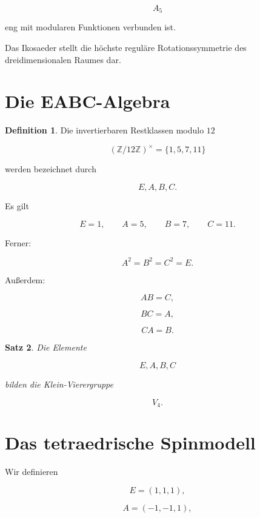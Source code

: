 \documentclass[11pt,a4paper]{article}
\newtheorem{satz}{Satz}[section]
\theoremstyle{definition}
\newtheorem{definition}[satz]{Definition}
\theoremstyle{remark}
\begin{document}
	\[
	A_5
	\]
	
	eng mit modularen Funktionen verbunden ist.
	
	Das Ikosaeder stellt die höchste reguläre
	Rotationssymmetrie des dreidimensionalen Raumes dar.
	
	
	\section{Die EABC-Algebra}
	
	\begin{definition}
		
		Die invertierbaren Restklassen modulo \(12\)
		
		\[
		(\mathbb Z/12\mathbb Z)^\times
		=
		\{1,5,7,11\}
		\]
		
		werden bezeichnet durch
		
		\[
		E,A,B,C.
		\]
		
	\end{definition}
	
	Es gilt
	
	\[
	E=1,
	\qquad
	A=5,
	\qquad
	B=7,
	\qquad
	C=11.
	\]
	
	Ferner:
	
	\[
	A^2=B^2=C^2=E.
	\]
	
	Außerdem:
	
	\[
	AB=C,
	\]
	
	\[
	BC=A,
	\]
	
	\[
	CA=B.
	\]
	
	\begin{satz}
		
		Die Elemente
		
		\[
		E,A,B,C
		\]
		
		bilden die Klein-Vierergruppe
		
		\[
		V_4.
		\]
		
	\end{satz}
	
	
	\section{Das tetraedrische Spinmodell}
	
	Wir definieren
	
	\[
	E=(1,1,1),
	\]
	
	\[
	A=(-1,-1,1),
	\]
	
\end{document}
